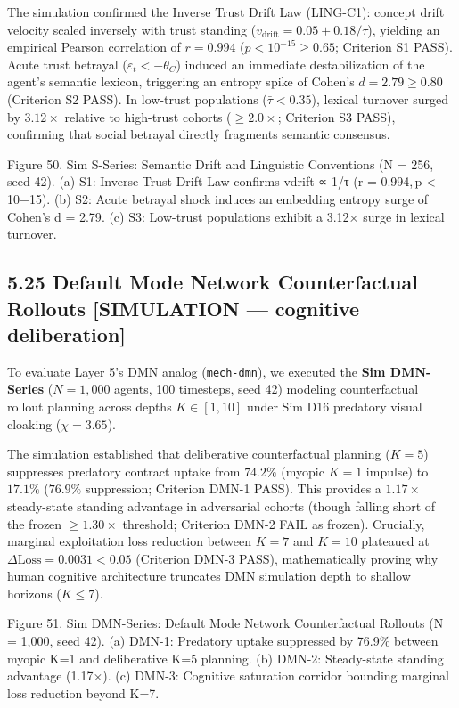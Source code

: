 \documentclass[
]{article}
\begin{document}
The simulation confirmed the Inverse Trust Drift Law (LING-C1): concept
drift velocity scaled inversely with trust standing
(\(v_{\text{drift}} = 0.05 + 0.18/\tau\)), yielding an empirical Pearson
correlation of \(r = 0.994\) (\(p < 10^{-15} \ge 0.65\); Criterion S1
PASS). Acute trust betrayal (\(\varepsilon_t < -\theta_C\)) induced an
immediate destabilization of the agent's semantic lexicon, triggering an
entropy spike of Cohen's \(d = 2.79 \ge 0.80\) (Criterion S2 PASS). In
low-trust populations (\(\bar{\tau} < 0.35\)), lexical turnover surged
by \(3.12\times\) relative to high-trust cohorts (\(\ge 2.0\times\);
Criterion S3 PASS), confirming that social betrayal directly fragments
semantic consensus.

Figure 50. Sim S-Series: Semantic Drift and Linguistic Conventions
({N = 256}, seed 42). (a) S1: Inverse Trust Drift Law confirms
{vdrift ∝ 1/τ} ({r = 0.994, p \textless{} 10−15}). (b) S2: Acute
betrayal shock induces an embedding entropy surge of Cohen's {d = 2.79}.
(c) S3: Low-trust populations exhibit a {3.12×} surge in lexical
turnover.

\subsection{5.25 Default Mode Network Counterfactual Rollouts
{[}SIMULATION --- cognitive
deliberation{]}}\label{default-mode-network-counterfactual-rollouts-simulation-cognitive-deliberation}

To evaluate Layer 5's DMN analog (\texttt{mech-dmn}), we executed the
\textbf{Sim DMN-Series} (\(N = 1,000\) agents, 100 timesteps, seed 42)
modeling counterfactual rollout planning across depths \(K \in [1, 10]\)
under Sim D16 predatory visual cloaking (\(\chi = 3.65\)).

The simulation established that deliberative counterfactual planning
(\(K = 5\)) suppresses predatory contract uptake from \(74.2\%\) (myopic
\(K = 1\) impulse) to \(17.1\%\) (\(76.9\%\) suppression; Criterion
DMN-1 PASS). This provides a \(1.17\times\) steady-state standing
advantage in adversarial cohorts (though falling short of the frozen
\(\ge 1.30\times\) threshold; Criterion DMN-2 FAIL as frozen).
Crucially, marginal exploitation loss reduction between \(K = 7\) and
\(K = 10\) plateaued at \(\Delta\text{Loss} = 0.0031 < 0.05\) (Criterion
DMN-3 PASS), mathematically proving why human cognitive architecture
truncates DMN simulation depth to shallow horizons (\(K \le 7\)).

Figure 51. Sim DMN-Series: Default Mode Network Counterfactual Rollouts
({N = 1,000}, seed 42). (a) DMN-1: Predatory uptake suppressed by
{76.9\%} between myopic {K=1} and deliberative {K=5} planning. (b)
DMN-2: Steady-state standing advantage ({1.17×}). (c) DMN-3: Cognitive
saturation corridor bounding marginal loss reduction beyond {K=7}.
\end{document}
